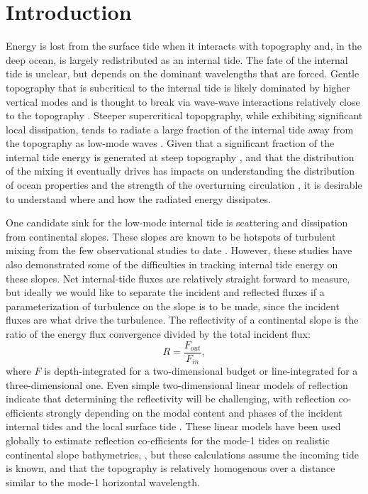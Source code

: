 \documentclass[12pt]{article}
\begin{document}
\section{Introduction}


Energy is lost from the surface tide when it interacts with topography and, in the deep ocean, is largely redistributed as an internal tide.  The fate of the internal tide is unclear, but depends on the dominant wavelengths that are forced.  Gentle topography that is subcritical to the internal tide is likely dominated by higher vertical modes and is thought to break via wave-wave interactions relatively close to the topography \citep[i.e.][]{polzin09,stlaurentgarrett02}.  Steeper supercritical topopgraphy, while exhibiting significant local dissipation, tends to radiate a large fraction of the internal tide away from the topography as low-mode waves \citep[i.e. at Hawaii;][]{klymaketal06b,carteretal08}.  Given that a significant fraction of the internal tide energy is generated at steep topography \citep{leggklymak08}, and that the distribution of the mixing it eventually drives has impacts on understanding the distribution of ocean properties and the strength of the overturning circulation \citep[i.e.][]{meletetal13}, it is desirable to understand where and how the radiated energy dissipates.

One candidate sink for the low-mode internal tide is scattering and dissipation from continental slopes.  These slopes are known to be hotspots of turbulent mixing from the few observational studies to date \citep{nashetal07,klymaketal11a,martinietal13}.  However, these studies have also demonstrated some of the difficulties in tracking internal tide energy on these slopes.  Net internal-tide fluxes are relatively straight forward to measure, but ideally we would like to separate the incident and reflected fluxes if a parameterization of turbulence on the slope is to be made, since the incident fluxes are what drive the turbulence.  The reflectivity of a continental slope is the ratio of the energy flux convergence divided by the total incident flux: 
\begin{equation}
 R = \frac{F_{out}}{F_{in}},
\end{equation}
where $F$ is depth-integrated for a two-dimensional budget or line-integrated for a three-dimensional one.  Even simple two-dimensional linear models of reflection indicate that determining the reflectivity will be challenging, with reflection co-efficients strongly depending on the modal content and phases of the incident internal tides \citep{klymaketal11a} and the local surface tide \citep{kellynash10}.  These linear models have been used globally to estimate reflection co-efficients for the mode-1 tides on realistic continental slope bathymetries, \citep{kellyetal13a,kellyetal13b}, but these calculations assume the incoming tide is known, and that the topography is relatively homogenous over a distance similar to the mode-1 horizontal wavelength.  
\end{document}
